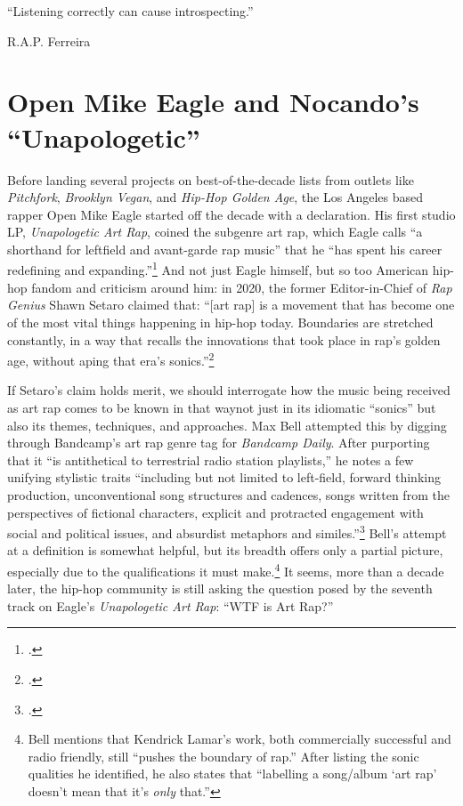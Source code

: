\onehalfspacing
\label{chapter1}
\epigraph{{``Listening correctly can cause introspecting.''}}{R.A.P. Ferreira}

\section{Open Mike Eagle and Nocando's ``Unapologetic''}

Before landing several projects on best-of-the-decade lists from outlets like \textit{Pitchfork},
\textit{Brooklyn Vegan}, and \textit{Hip-Hop Golden Age}, the Los Angeles based rapper Open Mike
Eagle started off the decade with a declaration. His first studio LP, \textit{Unapologetic Art Rap},
coined the subgenre art rap, which Eagle calls ``a shorthand for leftfield and avant-garde rap music''
that he ``has spent his career redefining and expanding.''\footnote{
    \cite{openmikeeagle}.}
And not just Eagle himself, but so too American hip-hop fandom and criticism around him: in 2020,
the former Editor-in-Chief of \textit{Rap Genius} Shawn Setaro claimed that: ``[art rap] is a 
movement that has become one of the most vital things happening in hip-hop today. Boundaries are
stretched constantly, in a way that recalls the innovations that took place in rap's golden age, 
without aping that era's  sonics.''\footnote{
    \cite{shawnsetaroWhyYouShould2020}.}

If Setaro's claim holds merit, we should interrogate how the music being received as art rap comes
to be known in that way\textemdash not just in its idiomatic ``sonics'' but also its themes,
techniques, and approaches. Max Bell attempted this by digging through Bandcamp's art rap genre
tag for \textit{Bandcamp  Daily}. After purporting that it ``is antithetical to terrestrial radio 
station playlists,'' he notes a few unifying stylistic traits ``including but not limited to 
left-field, forward thinking production, unconventional song structures and cadences, songs written
from the perspectives of fictional characters, explicit and protracted engagement with social and 
political issues, and absurdist metaphors and similes.''\footnote{
    \cite{maxbellWalkAvantGardeWorld2017}.} 
Bell's attempt at a definition is somewhat helpful, but its breadth offers only a partial picture, 
especially due to the qualifications it must make.\footnote{
    Bell mentions that Kendrick Lamar's work, both commercially successful and radio friendly,
    still ``pushes the boundary of rap.'' After listing the sonic qualities he identified, he
    also states that ``labelling a song/album `art rap' doesn't mean that it's \textit{only}
    that.''} 
It seems, more than a decade later, the hip-hop community is still asking the question posed by
the seventh track on Eagle's \textit{Unapologetic Art Rap}: ``WTF is Art Rap?''

